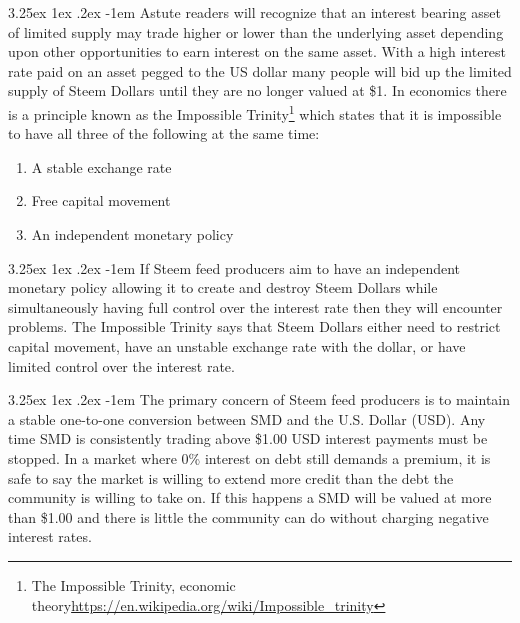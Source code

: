 \documentclass{article}
\makeatletter
\renewcommand\paragraph{\@startsection{paragraph}{5}{\z@}%
  {3.25ex \@plus1ex \@minus.2ex}%
  {-1em}%
  {\normalfont\normalsize\bfseries}}
\makeatother
\begin{document}
				\paragraph{}
					Astute readers will recognize that an interest bearing asset of limited supply may trade higher or lower than the underlying asset depending upon other opportunities to earn interest on the same asset. With a high interest rate paid on an asset pegged to the US dollar many people will bid up the limited supply of Steem Dollars until they are no longer valued at \$1. In economics there is a principle known as the Impossible Trinity\footnote{The Impossible Trinity, economic theory\newline\url{https://en.wikipedia.org/wiki/Impossible_trinity}} which states that it is impossible to have all three of the following at the same time:

				\begin{enumerate}
					\item A stable exchange rate
					\item Free capital movement
					\item An independent monetary policy
				\end{enumerate}

				\paragraph{}
					If Steem feed producers aim to have an independent monetary policy allowing it to create and destroy Steem Dollars while simultaneously having full control over the interest rate then they will encounter problems. The Impossible Trinity says that Steem Dollars either need to restrict capital movement, have an unstable exchange rate with the dollar, or have limited control over the interest rate.

				\paragraph{}
					The primary concern of Steem feed producers is to maintain a stable one-to-one conversion between SMD and the U.S. Dollar (USD). Any time SMD is consistently trading above \$1.00 USD interest payments must be stopped. In a market where 0\% interest on debt still demands a premium, it is safe to say the market is willing to extend more credit than the debt the community is willing to take on. If this happens a SMD will be valued at more than \$1.00 and there is little the community can do without charging negative interest rates.
\end{document}

